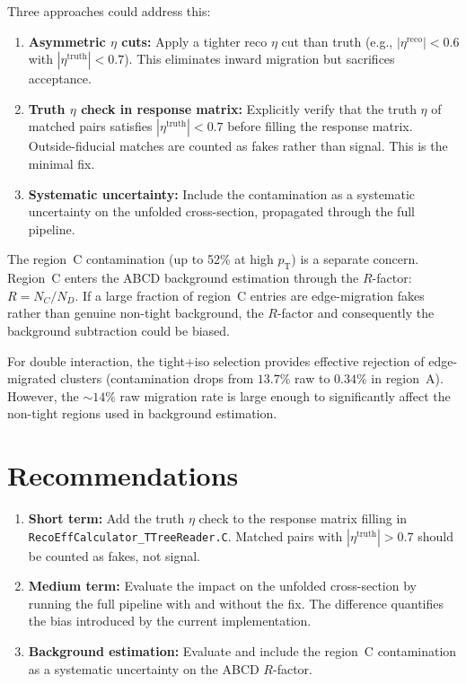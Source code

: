 \documentclass[11pt,letterpaper]{article}
\newcommand{\pT}{\ensuremath{p_{\text{T}}}}
\begin{document}
Three approaches could address this:

\begin{enumerate}
  \item \textbf{Asymmetric $\eta$ cuts:} Apply a tighter reco $\eta$ cut than
    truth (e.g., $|\eta^\text{reco}| < 0.6$ with $|\eta^\text{truth}| < 0.7$).
    This eliminates inward migration but sacrifices acceptance.

  \item \textbf{Truth $\eta$ check in response matrix:} Explicitly verify that
    the truth $\eta$ of matched pairs satisfies $|\eta^\text{truth}| < 0.7$
    before filling the response matrix. Outside-fiducial matches are counted as
    fakes rather than signal. This is the minimal fix.

  \item \textbf{Systematic uncertainty:} Include the contamination as a
    systematic uncertainty on the unfolded cross-section, propagated through the
    full pipeline.
\end{enumerate}

The region~C contamination (up to 52\% at high $\pT$) is a separate concern.
Region~C enters the ABCD background estimation through the $R$-factor:
$R = N_C / N_D$. If a large fraction of region~C entries are edge-migration
fakes rather than genuine non-tight background, the $R$-factor and consequently
the background subtraction could be biased.

For double interaction, the tight+iso selection provides effective rejection of
edge-migrated clusters (contamination drops from $13.7\%$ raw to $0.34\%$ in
region~A). However, the ${\sim}14\%$ raw migration rate is large enough to
significantly affect the non-tight regions used in background estimation.

\section{Recommendations}
\label{sec:recommendations}

\begin{enumerate}
  \item \textbf{Short term:} Add the truth $\eta$ check to the response matrix
    filling in \texttt{RecoEffCalculator\_TTreeReader.C}. Matched pairs with
    $|\eta^\text{truth}| > 0.7$ should be counted as fakes, not signal.

  \item \textbf{Medium term:} Evaluate the impact on the unfolded cross-section
    by running the full pipeline with and without the fix. The difference
    quantifies the bias introduced by the current implementation.

  \item \textbf{Background estimation:} Evaluate and include the region~C
    contamination as a systematic uncertainty on the ABCD $R$-factor.
\end{enumerate}
\end{document}
